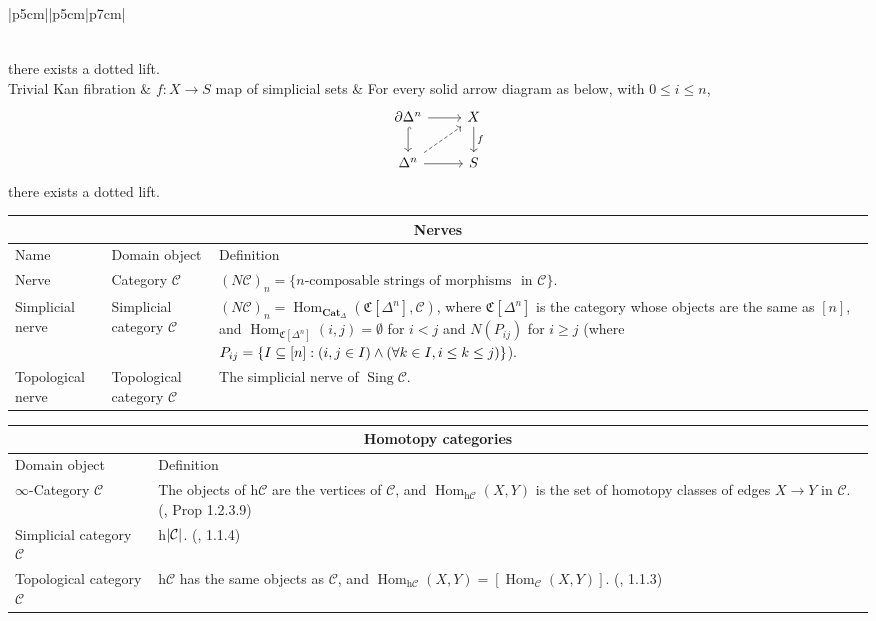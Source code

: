 \documentclass{article}
\DeclareMathOperator{\Hom}{Hom}
\DeclareMathOperator{\Sing}{Sing}
\def\subq{\ensuremath\subseteq}
\def\del{\ensuremath\partial}
\begin{document}
\begin{centre}
\begin{longtable}{ |p{5cm}||p{5cm}|p{7cm}| }
\[\begin{tikzcd}
\end{tikzcd}\] there exists a dotted lift. \cite[\href{https://kerodon.net/tag/021R}{Def 021R}]{kerodon}\\
\hline 
 Trivial Kan fibration & \(f : X \to S\) map of simplicial sets & For every solid arrow diagram as below, with \(0 \leq i \leq n\), \[\begin{tikzcd}
\del\Delta^n \arrow[r, ""] \arrow[d, swap, hookrightarrow]  & X \arrow[d, "f"]  \\
\Delta^n \arrow[r, swap, ""] \arrow[ur, dashrightarrow]  & S
\end{tikzcd}\] there exists a dotted lift. \cite[\href{https://kerodon.net/tag/006W}{Def 006W}]{kerodon}\\
\hline 
\end{longtable}

\text{}

\text{}

\begin{tabular}{ |p{3cm}||p{5cm}|p{7cm}|}
 \hline
 \multicolumn{3}{|c|}{Nerves}\\
 \hline
 Name& Domain object & Definition\\
  \hline\hline
  Nerve & Category \(\mathcal{C}\) & \((N\mathcal{C})_n=\text{\{}n\text{-composable strings of morphisms}\) \(\text{ in } \mathcal{C}\text{\}}\). \\
 \hline
 Simplicial nerve & Simplicial category \(\mathcal{C}\) & \((N \mathcal{C})_n=\Hom_{\textbf{Cat}_\Delta}(\mathfrak{C}[\Delta^n], \mathcal{C})\), where \(\mathfrak{C}[\Delta^n]\) is the category whose objects are the same as \([n]\), and \(\Hom_{\mathfrak{C}[\Delta^n]}(i,j)=\emptyset\) for \(i<j\) and \(N(P_{ij})\) for \(i\geq j\) (where \(P_{ij}=\{I \subq [n] : (i, j \in I)\wedge (\forall k \in I, i \leq k \leq j)\}\)).\\
 \hline
 Topological nerve & Topological category \(\mathcal{C}\) & The simplicial nerve of \(\Sing \mathcal{C}\).\\
 \hline
\end{tabular}

\text{}

\text{}

\begin{tabular}{ |p{5cm}||p{8cm}|}
 \hline
 \multicolumn{2}{|c|}{Homotopy categories}\\
 \hline
 Domain object & Definition\\
  \hline\hline
  \(\infty\)-Category \(\mathcal{C}\) & The objects of h\(\mathcal{C}\) are the vertices of \(\mathcal{C}\), and \(\Hom_{\text{h}\mathcal{C}}(X,Y)\) is the set of homotopy classes of edges \(X\to Y\) in \(\mathcal{C}\). (\autocite{htt}, Prop 1.2.3.9)\\
  \hline
  Simplicial category \(\mathcal{C}\) & h\(\lvert\mathcal{C}\rvert\). (\autocite{htt}, 1.1.4) \\ 
 \hline
   Topological category \(\mathcal{C}\) & h\(\mathcal{C}\) has the same objects as \(\mathcal{C}\), and \(\Hom_{\text{h}\mathcal{C}}(X,Y)=[\Hom_\mathcal{C}(X,Y)]\). (\autocite{htt}, 1.1.3) \\
  \hline 
\end{tabular}


\end{centre}
\end{document}
